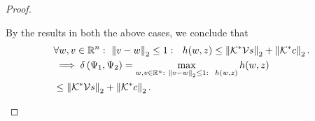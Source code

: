 \begin{proof}
\begin{enumerate}
  By the results in both the above cases, we conclude that
  \begin{align*}
& \forall w,v\in\mathbb{R}^n:~\left\|v-w\right\|_{2}\leq 1:~~h(w,z)\leq
    \left\|\mathcal{K}^*\mathcal{V}s\right\|_{2}+\left\|\mathcal{K}^*c\right\|_{2}.\\
& \implies \delta\left(\Psi_1,\Psi_2\right)=\max_{w,v\in\mathbb{R}^n:~\left\|v-w\right\|_{2}\leq
      1:~~h(w,z)}h(w,z)\\
&  \leq \left\|\mathcal{K}^*\mathcal{V}s\right\|_{2}+\left\|\mathcal{K}^*c\right\|_{2}.~~~~~~~~~~~\qedhere
  \end{align*}
\end{enumerate}
%
\end{proof}
%

